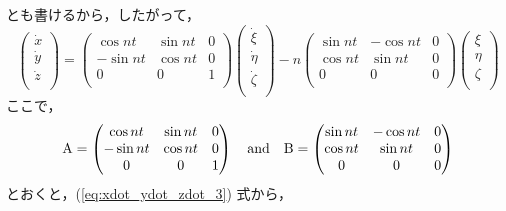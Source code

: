 \documentclass[11pt,a4paper,oneside,onecolumn]{jreport}
\begin{document}
とも書けるから，したがって，
\begin{equation}
\begin{pmatrix}
\dot{x}\\
\dot{y}\\
\dot{z}\\
\end{pmatrix}
= 
\begin{pmatrix}
\cos nt & \sin nt & 0\\
- \sin nt & \cos nt & 0\\
0 & 0 & 1\\
\end{pmatrix}
\begin{pmatrix}
\dot{\xi}\\
\dot{\eta}\\
\dot{\zeta}\\
\end{pmatrix}
- n
\begin{pmatrix}
\sin nt & - \cos nt & 0\\
\cos nt & \sin nt & 0\\
0 & 0 & 0\\
\end{pmatrix}
\begin{pmatrix}
\xi\\
\eta\\
\zeta\\
\end{pmatrix} \label{eq:xdot_ydot_zdot_3}
\end{equation}
ここで，
\begin{equation}
{\rm A} = 
\begin{pmatrix}
\cos nt & \sin nt & 0\\
- \sin nt & \cos nt & 0\\
0 & 0 & 1\\
\end{pmatrix}
 \quad {\rm and} \quad 
 {\rm B} = 
\begin{pmatrix}
\sin nt & - \cos nt & 0\\
\cos nt & \sin nt & 0\\
0 & 0 & 0\\
\end{pmatrix}
\end{equation}
とおくと，(\ref{eq:xdot_ydot_zdot_3}) 式から，
\end{document}
